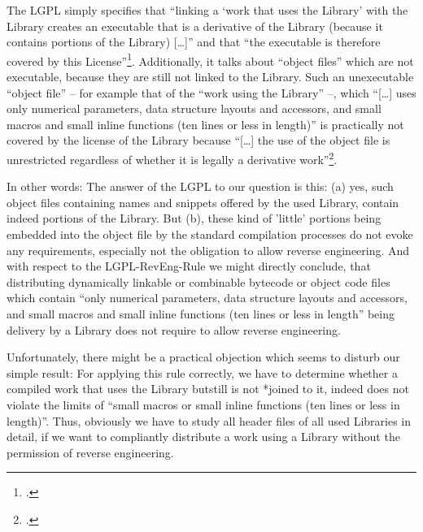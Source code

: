 The LGPL simply specifies that \enquote{linking a \enquote{work that uses the
Library} with the Library creates an executable that is a derivative of the
Library (because it contains portions of the Library) [\ldots]} and that
\enquote{the executable is therefore covered by this
License}\footcite[cf.][\nopage wp. §5]{Lgpl21OsiLicense199a}. Additionally, it
talks about \enquote{object files} which are not executable, because they are
still not linked to the Library. Such an unexecutable \enquote{object file} --
for example that of the \enquote{work using the Library} --, which
\enquote{[\ldots] uses only numerical parameters, data structure layouts and
accessors, and small macros and small inline functions (ten lines or less in
length)} is practically not covered by the license of the Library because
\enquote{[\ldots] the use of the object file is unrestricted regardless of
whether it is legally a derivative work}\footcite[cf.][\nopage wp.
§5]{Lgpl21OsiLicense199a}.

In other words: The answer of the LGPL to our question is this: (a) yes, such
object files containing names and snippets offered by the used Library, contain
indeed portions of the Library. But (b), these kind of 'little' portions being
embedded into the object file by the standard compilation processes do not evoke
any requirements, especially not the obligation to allow reverse engineering.
And with respect to the LGPL-RevEng-Rule we might directly conclude, that
distributing dynamically linkable or combinable bytecode or object code files
which contain \enquote{only numerical parameters, data structure layouts and
accessors, and small macros and small inline functions (ten lines or less in
length} being delivery by a Library does not require to allow reverse
engineering.

Unfortunately, there might be a practical objection which seems to disturb our
simple result: For applying this rule correctly, we have to determine whether a
compiled work that uses the Library butstill is not *joined to it, indeed does
not violate the limits of \enquote{small macros or small inline functions (ten
lines or less in length)}. Thus, obviously we have to study all header files of
all used Libraries in detail, if we want to compliantly distribute a work using
a Library without the permission of reverse engineering.

